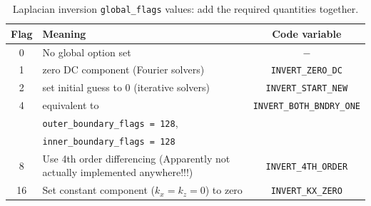\documentclass[12pt]{article}
\newcommand{\code}[1]{\texttt{#1}}
\begin{document}
%
\begin{table}
\caption{Laplacian inversion \code{global\_flags} values: add the required
quantities together.}
%
\label{tab:laplaceglobalflags}
%
\centering
%
\begin{tabular}[c]{c|p{10cm}|c}
\hline
Flag & Meaning & Code variable\\
\hline
    0 &
    No global option set &
    $-$
    \\
    1 &
    zero DC component (Fourier solvers) &
    \code{INVERT\_ZERO\_DC}
    \\
    2 &
    set initial guess to 0 (iterative solvers) &
    \code{INVERT\_START\_NEW}
    \\
    4 &
    equivalent to
        & \code{INVERT\_BOTH\_BNDRY\_ONE}
        \\
        &
    \code{outer\_boundary\_flags = 128},
        &\\
        &
    \code{inner\_boundary\_flags = 128} &
    \\
    8 &
    Use 4th order differencing (Apparently not actually implemented
    anywhere!!!) &
    \code{INVERT\_4TH\_ORDER}
    \\
    16 &
    Set constant component ($k_x = k_z = 0$) to zero &
    \code{INVERT\_KX\_ZERO}
    \\
\hline
\end{tabular}
%
\end{table}
%
\end{document}
